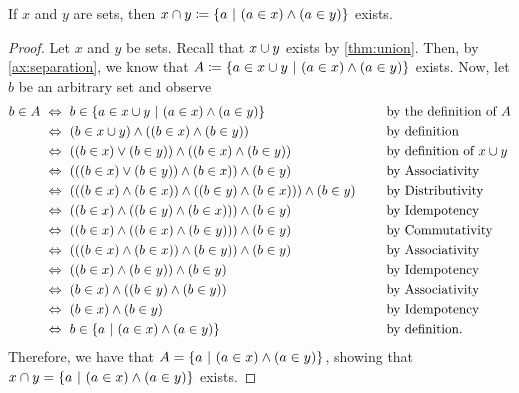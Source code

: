 \begin{theorem}\label{thm:intersection}
    If \(x\) and \(y\) are sets,
    then \(x \intersect y \defn \set*{a \suchthat (a \in x) \meet (a \in y)}\) exists.
\end{theorem}
\begin{proof}
    Let \(x\) and \(y\) be sets. Recall that \(x \cup y\) exists by \autoref{thm:union}.
    Then, by \autoref{ax:separation},
    we know that \(A \defn \set*{a \in x \union y \suchthat (a \in x) \meet (a \in y)}\) exists.
    Now, let \(b\) be an arbitrary set and observe
    \begin{alignat*}{2}
        b \in A &\iff b \in \set*{a \in x \union y \suchthat (a \in x) \meet (a \in y)} &&\text{by the definition of \(A\)} \\
                &\iff (b \in x \union y) \meet \pn*{(b \in x) \meet (b \in y)} &&\text{by definition} \\
                &\iff \pn*{(b \in x) \join (b \in y)} \meet \pn*{(b \in x) \meet (b \in y)} &&\text{by definition of } x \union y \\
                &\iff \pn*{\pn*{(b \in x) \join (b \in y)} \meet (b \in x)} \meet (b \in y) &&\text{by Associativity} \\
                &\iff \pn*{\pn*{(b \in x) \meet (b \in x)} \meet \pn*{(b \in y) \meet (b \in x)}} \meet (b \in y)~~~~&&\text{by Distributivity} \\
                &\iff \pn*{(b \in x) \meet \pn*{(b \in y) \meet (b \in x)}} \meet (b \in y) &&\text{by Idempotency} \\
                &\iff \pn*{(b \in x) \meet \pn*{(b \in x) \meet (b \in y)}} \meet (b \in y) &&\text{by Commutativity} \\
                &\iff \pn*{\pn*{(b \in x) \meet (b \in x)} \meet (b \in y)} \meet (b \in y) &&\text{by Associativity} \\
                &\iff \pn*{(b \in x) \meet (b \in y)} \meet (b \in y) &&\text{by Idempotency} \\
                &\iff (b \in x) \meet \pn*{(b \in y) \meet (b \in y)} &&\text{by Associativity} \\
                &\iff (b \in x) \meet (b \in y) &&\text{by Idempotency} \\
                &\iff b \in \set*{a \suchthat (a \in x) \meet (a \in y)} &&\text{by definition}.
    \end{alignat*}
    Therefore, we have that \(A = \set*{a \suchthat (a \in x) \meet (a \in y)}\),
    showing that \(x \intersect y = \set*{a \suchthat (a \in x) \meet (a \in y)}\) exists.
\end{proof}

